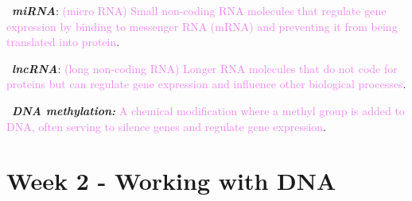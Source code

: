 \documentclass[a4paper]{article}
\newcommand{\fakeitem}[1]{{\textbullet}~\textbf{\textit{#1}}}
\newcommand{\gpt}[1]{\textcolor{violet}{#1}}
\begin{document}





\fakeitem{miRNA}: \gpt{(micro RNA) Small non-coding RNA molecules that regulate gene expression by binding to messenger RNA (mRNA) and preventing it from being translated into protein}.

\fakeitem{lncRNA}: \gpt{(long non-coding RNA) Longer RNA molecules that do not code for proteins but can regulate gene expression and influence other biological processes}.



\fakeitem{DNA methylation:} \gpt{A chemical modification where a methyl group is added to DNA, often serving to silence genes and regulate gene expression}.



\newpage
\section*{Week 2 - Working with DNA}
\end{document}
